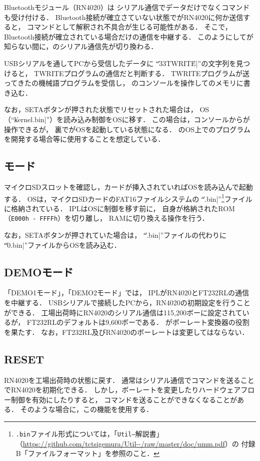 Bluetoothモジュール（RN4020）は
シリアル通信でデータだけでなくコマンドも受け付ける．
Bluetooth接続が確立さていない状態で{\tac}がRN4020に何か送信すると，
コマンドとして解釈され不具合が生じる可能性がある．
そこで，Bluetooth接続が確立されている場合だけ{\tec}の通信を中継する．
このようにして{\tec}が知らない間に，{\tec}のシリアル通信先が切り換わる．

USBシリアルを通してPCから受信したデータに
``\|\033TWRITE\r\n|''の文字列を見つけると，
TWRITEプログラムの通信だと判断する．
TWRITEプログラムが送ってきた{\tec}の機械語プログラムを受信し，
{\tec}のコンソールを操作して{\tec}のメモリに書き込む．

なお，SETAボタンが押された状態でリセットされた場合は，
OS（``\|kernel.bin|''）を読み込み制御をOSに移す．
この場合は，コンソールから{\tec}が操作できるが，
裏で{\tac}がOSを起動している状態になる．
{\tac}のOS上で{\tec}のプログラムを開発する場合等に使用することを想定している．

\subsection{{\tac}モード}
マイクロSDスロットを確認し，カードが挿入されていればOSを読み込んで起動する．
OSは，マイクロSDカードのFAT16ファイルシステムの
``\|.bin|''\footnote{
\texttt{.bin}ファイル形式については，「\texttt{Util--}解説書」
（\url{https://github.com/tctsigemura/Util--/raw/master/doc/umm.pdf}）の
付録B「ファイルフォーマット」を参照のこと．
}ファイルに格納されている．
IPLはOSに制御を移す前に，
自身が格納されたROM（\texttt{E000h - FFFFh}）を切り離し，
RAMに切り換える操作を行う．

なお，SETAボタンが押されていた場合は，
``\|.bin|''ファイルの代わりに
``\|0.bin|''ファイルからOSを読み込む．

\subsection{DEMOモード}
「DEMO1モード」，「DEMO2モード」では，
IPLがRN4020とFT232RLの通信を中継する．
USBシリアルで接続したPCから，RN4020の初期設定を行うことができる．
工場出荷時にRN4020のシリアル通信は115,200ボーに設定されているが，
FT232RLのデフォルトは9,600ボーである．
{\tac}がボーレート変換器の役割を果たす．
なお，FT232RL及びRN4020のボーレートは変更してはならない．

\subsection{RESET}
RN4020を工場出荷時の状態に戻す．
通常はシリアル通信でコマンドを送ることでRN4020を初期化できる．
しかし，ボーレートを変更したりハードウェアフロー制御を有効にしたりすると，
コマンドを送ることができなくなることがある．
そのような場合に，この機能を使用する．

